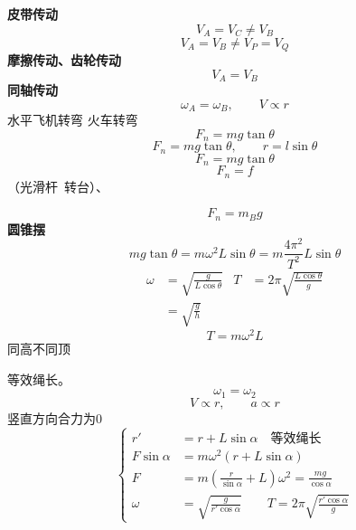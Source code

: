 \textbf{皮带传动}
\[ V_A=V_C\neq V_B \]
\[ V_A=V_B\neq V_P=V_Q \]
\textbf{摩擦传动、齿轮传动}
\[ V_A=V_B \]
\textbf{同轴传动}
\[ \omega_A=\omega_B,\qquad V\propto r \]
水平飞机转弯
火车转弯
\[ F_n=mg\tan\theta \]
\[ F_n=mg\tan\theta,\qquad r=l\sin\theta \]
\[ F_n=mg\tan\theta \]
\[ F_n=f \]
（光滑杆\ 转台）、\par
\[ F_n=m_Bg \]
\textbf{圆锥摆}
\[ mg\tan\theta=m\omega^2L\sin\theta=m\frac{4\pi^2}{T^2}L\sin\theta \]
\begin{align*}
\omega&=\sqrt{\frac{g}{L\cos\theta}} & T&=2\pi\sqrt{\frac{L\cos\theta}{g}}\\
&=\sqrt{\frac{g}{h}}
\end{align*}
\[ T=m\omega^2L \]
同高不同顶\par
等效绳长。
\[ \omega_1=\omega_2 \]
\[ V\propto r,\qquad a\propto r \]
竖直方向合力为0
\[
\left\{\begin{aligned}
r'&=r+L\sin\alpha\quad\text{等效绳长}\\
F\sin\alpha&=m\omega^2(r+L\sin\alpha)\\
F&=m\left(\frac{r}{\sin\alpha}+L\right)\omega^2=\frac{mg}{\cos\alpha}\\
\omega&=\sqrt{\frac{g}{r'\cos\alpha}}\qquad T=2\pi\sqrt{\frac{r'\cos\alpha}{g}}
\end{aligned}\right.
\] %
